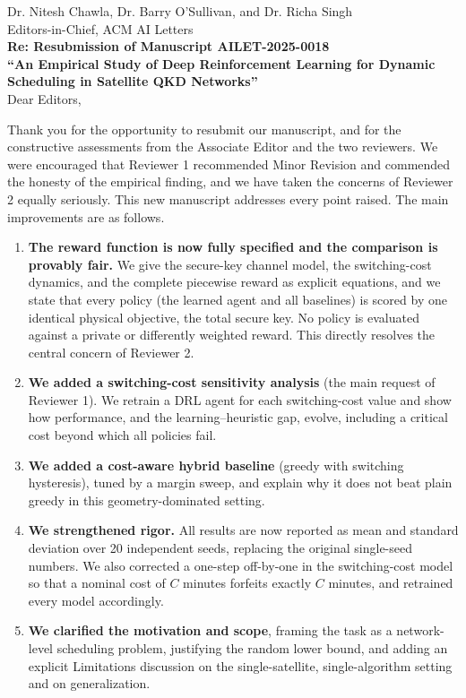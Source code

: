\documentclass[11pt]{article}
\begin{document}
\thispagestyle{empty}

\noindent Dr. Nitesh Chawla, Dr. Barry O'Sullivan, and Dr. Richa Singh\\
Editors-in-Chief, ACM AI Letters\\[1em]

\noindent\textbf{Re: Resubmission of Manuscript AILET-2025-0018}\\
\textbf{``An Empirical Study of Deep Reinforcement Learning for Dynamic Scheduling in Satellite QKD Networks''}\\[1em]

\noindent Dear Editors,

Thank you for the opportunity to resubmit our manuscript, and for the constructive
assessments from the Associate Editor and the two reviewers. We were encouraged
that Reviewer 1 recommended Minor Revision and commended the honesty of the
empirical finding, and we have taken the concerns of Reviewer 2 equally seriously.
This new manuscript addresses every point raised. The main improvements are as
follows.

\begin{enumerate}
  \item \textbf{The reward function is now fully specified and the comparison is
  provably fair.} We give the secure-key channel model, the switching-cost
  dynamics, and the complete piecewise reward as explicit equations, and we state
  that every policy (the learned agent and all baselines) is scored by one
  identical physical objective, the total secure key. No policy is evaluated
  against a private or differently weighted reward. This directly resolves the
  central concern of Reviewer 2.

  \item \textbf{We added a switching-cost sensitivity analysis} (the main request
  of Reviewer 1). We retrain a DRL agent for each switching-cost value and show how
  performance, and the learning--heuristic gap, evolve, including a critical cost
  beyond which all policies fail.

  \item \textbf{We added a cost-aware hybrid baseline} (greedy with switching
  hysteresis), tuned by a margin sweep, and explain why it does not beat plain
  greedy in this geometry-dominated setting.

  \item \textbf{We strengthened rigor.} All results are now reported as mean and
  standard deviation over 20 independent seeds, replacing the original single-seed
  numbers. We also corrected a one-step off-by-one in the switching-cost model so
  that a nominal cost of $C$ minutes forfeits exactly $C$ minutes, and retrained
  every model accordingly.

  \item \textbf{We clarified the motivation and scope}, framing the task as a
  network-level scheduling problem, justifying the random lower bound, and adding
  an explicit Limitations discussion on the single-satellite, single-algorithm
  setting and on generalization.
\end{enumerate}
\end{document}
